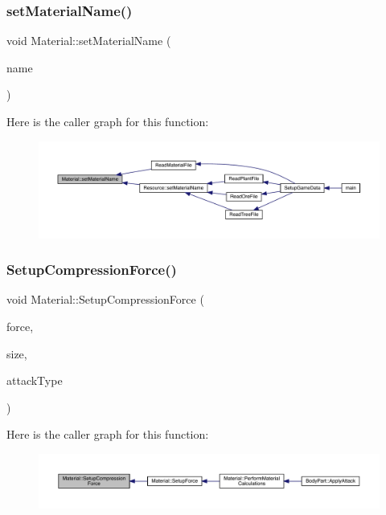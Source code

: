 \subsubsection{\texorpdfstring{set\+Material\+Name()}{setMaterialName()}}
{\footnotesize\ttfamily void Material\+::set\+Material\+Name (\begin{DoxyParamCaption}\item[{std\+::string}]{name }\end{DoxyParamCaption})}

Here is the caller graph for this function\+:
\nopagebreak
\begin{figure}[H]
\begin{center}
\leavevmode
\includegraphics[width=350pt]{dc/dee/class_material_ab73b88e094cf38d28f9addfd12357b04_icgraph}
\end{center}
\end{figure}
\mbox{\label{class_material_a9fa7b190d0621069612e848150e780ee}} 
\subsubsection{\texorpdfstring{Setup\+Compression\+Force()}{SetupCompressionForce()}}
{\footnotesize\ttfamily void Material\+::\+Setup\+Compression\+Force (\begin{DoxyParamCaption}\item[{float}]{force,  }\item[{float}]{size,  }\item[{\mbox{\hyperlink{_enum_types_8hpp_a904b2f9c8f3951116c343784c59d6afe}{Attack\+Type}}}]{attack\+Type }\end{DoxyParamCaption})\hspace{0.3cm}{\ttfamily [private]}}

Here is the caller graph for this function\+:
\nopagebreak
\begin{figure}[H]
\begin{center}
\leavevmode
\includegraphics[width=350pt]{dc/dee/class_material_a9fa7b190d0621069612e848150e780ee_icgraph}
\end{center}
\end{figure}
\mbox{\label{class_material_aa2951eaa13d1f8137cc228ccc9b0c33c}} 
